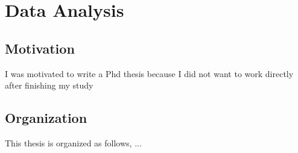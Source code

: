 \chapter{Data Analysis}
\section{Motivation}
I was motivated to write a Phd thesis because I did not want to work directly after finishing my study
\section{Organization}
This thesis is organized as follows, ...